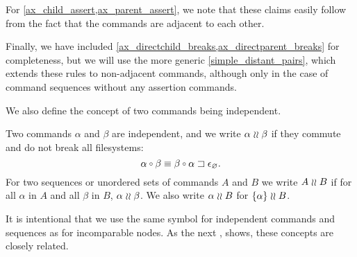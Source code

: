 For \cref{ax_child_assert,ax_parent_assert}, we note that these claims
easily follow from the fact that the commands are adjacent to each other.

Finally, we have included \cref{ax_directchild_breaks,ax_directparent_breaks}
for completeness, but we will use the more generic \cref{simple_distant_pairs},
which extends these rules to non-adjacent commands, although only in the case
of command sequences without any assertion commands.





\myskip
We also define the concept of two commands being independent.

\begin{mydef}
Two commands $\alpha$ and $\beta$ 
are independent, and we write $\alpha\mathrel{\wr\wr}\beta$ if 
they commute and do not break all filesystems:
\[ \alpha\cc\beta \equiv \wrksx{\beta\cc\alpha}. \]
For two sequences or unordered sets of commands $A$ and $B$ we write $A\mathrel{\wr\wr} B$ if
for all $\alpha$ in $A$ and all $\beta$ in $B$, $\alpha\mathrel{\wr\wr}\beta$.
We also write $\alpha\mathrel{\wr\wr} B$ for $\{\alpha\}\mathrel{\wr\wr} B$.
\end{mydef}

It is intentional that we use the same symbol for independent commands
and sequences as for incomparable nodes. As the next
,
shows, these concepts are closely related.

